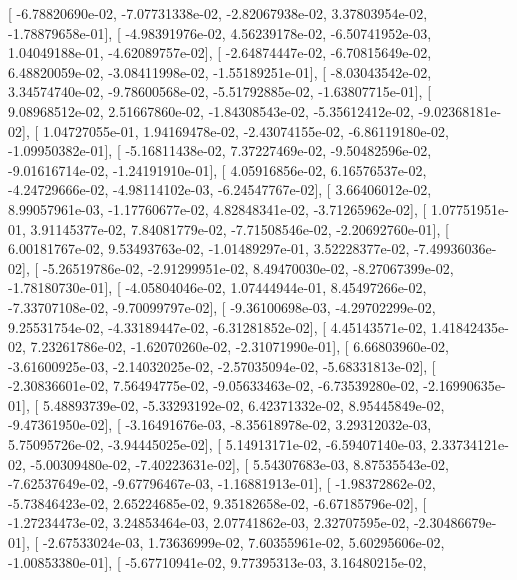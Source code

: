 \documentclass{article}
\begin{document}
       [ -6.78820690e-02,  -7.07731338e-02,  -2.82067938e-02,
          3.37803954e-02,  -1.78879658e-01],
       [ -4.98391976e-02,   4.56239178e-02,  -6.50741952e-03,
          1.04049188e-01,  -4.62089757e-02],
       [ -2.64874447e-02,  -6.70815649e-02,   6.48820059e-02,
         -3.08411998e-02,  -1.55189251e-01],
       [ -8.03043542e-02,   3.34574740e-02,  -9.78600568e-02,
         -5.51792885e-02,  -1.63807715e-01],
       [  9.08968512e-02,   2.51667860e-02,  -1.84308543e-02,
         -5.35612412e-02,  -9.02368181e-02],
       [  1.04727055e-01,   1.94169478e-02,  -2.43074155e-02,
         -6.86119180e-02,  -1.09950382e-01],
       [ -5.16811438e-02,   7.37227469e-02,  -9.50482596e-02,
         -9.01616714e-02,  -1.24191910e-01],
       [  4.05916856e-02,   6.16576537e-02,  -4.24729666e-02,
         -4.98114102e-03,  -6.24547767e-02],
       [  3.66406012e-02,   8.99057961e-03,  -1.17760677e-02,
          4.82848341e-02,  -3.71265962e-02],
       [  1.07751951e-01,   3.91145377e-02,   7.84081779e-02,
         -7.71508546e-02,  -2.20692760e-01],
       [  6.00181767e-02,   9.53493763e-02,  -1.01489297e-01,
          3.52228377e-02,  -7.49936036e-02],
       [ -5.26519786e-02,  -2.91299951e-02,   8.49470030e-02,
         -8.27067399e-02,  -1.78180730e-01],
       [ -4.05804046e-02,   1.07444944e-01,   8.45497266e-02,
         -7.33707108e-02,  -9.70099797e-02],
       [ -9.36100698e-03,  -4.29702299e-02,   9.25531754e-02,
         -4.33189447e-02,  -6.31281852e-02],
       [  4.45143571e-02,   1.41842435e-02,   7.23261786e-02,
         -1.62070260e-02,  -2.31071990e-01],
       [  6.66803960e-02,  -3.61600925e-03,  -2.14032025e-02,
         -2.57035094e-02,  -5.68331813e-02],
       [ -2.30836601e-02,   7.56494775e-02,  -9.05633463e-02,
         -6.73539280e-02,  -2.16990635e-01],
       [  5.48893739e-02,  -5.33293192e-02,   6.42371332e-02,
          8.95445849e-02,  -9.47361950e-02],
       [ -3.16491676e-03,  -8.35618978e-02,   3.29312032e-03,
          5.75095726e-02,  -3.94445025e-02],
       [  5.14913171e-02,  -6.59407140e-03,   2.33734121e-02,
         -5.00309480e-02,  -7.40223631e-02],
       [  5.54307683e-03,   8.87535543e-02,  -7.62537649e-02,
         -9.67796467e-03,  -1.16881913e-01],
       [ -1.98372862e-02,  -5.73846423e-02,   2.65224685e-02,
          9.35182658e-02,  -6.67185796e-02],
       [ -1.27234473e-02,   3.24853464e-03,   2.07741862e-03,
          2.32707595e-02,  -2.30486679e-01],
       [ -2.67533024e-03,   1.73636999e-02,   7.60355961e-02,
          5.60295606e-02,  -1.00853380e-01],
       [ -5.67710941e-02,   9.77395313e-03,   3.16480215e-02,
\end{document}
